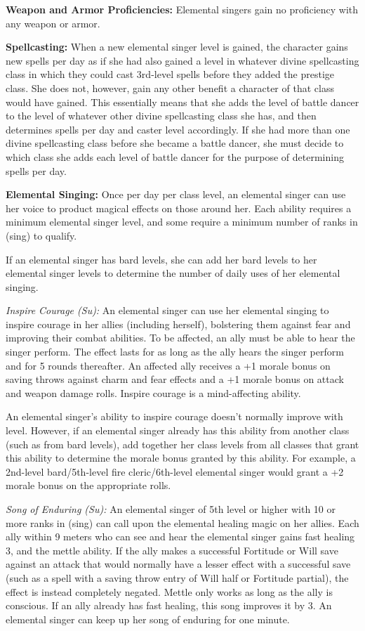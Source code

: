 {
\textbf{Weapon and Armor Proficiencies:} Elemental singers gain no proficiency with any weapon or armor.

\textbf{Spellcasting:} When a new elemental singer level is gained, the character gains new spells per day as if she had also gained a level in whatever divine spellcasting class in which they could cast 3rd-level spells before they added the prestige class. She does not, however, gain any other benefit a character of that class would have gained. This essentially means that she adds the level of battle dancer to the level of whatever other divine spellcasting class she has, and then determines spells per day and caster level accordingly. If she had more than one divine spellcasting class before she became a battle dancer, she must decide to which class she adds each level of battle dancer for the purpose of determining spells per day.

\textbf{Elemental Singing:} Once per day per class level, an elemental singer can use her voice to product magical effects on those around her. Each ability requires a minimum elemental singer level, and some require a minimum number of ranks in  (sing) to qualify.

If an elemental singer has bard levels, she can add her bard levels to her elemental singer levels to determine the number of daily uses of her elemental singing.

\textit{Inspire Courage (Su):} An elemental singer can use her elemental singing to inspire courage in her allies (including herself), bolstering them against fear and improving their combat abilities. To be affected, an ally must be able to hear the singer perform. The effect lasts for as long as the ally hears the singer perform and for 5 rounds thereafter. An affected ally receives a +1 morale bonus on saving throws against charm and fear effects and a +1 morale bonus on attack and weapon damage rolls. Inspire courage is a mind-affecting ability.

An elemental singer's ability to inspire courage doesn't normally improve with level. However, if an elemental singer already has this ability from another class (such as from bard levels), add together her class levels from all classes that grant this ability to determine the morale bonus granted by this ability. For example, a 2nd-level bard/5th-level fire cleric/6th-level elemental singer would grant a +2 morale bonus on the appropriate rolls.

\textit{Song of Enduring (Su):} An elemental singer of 5th level or higher with 10 or more ranks in  (sing) can call upon the elemental healing magic on her allies. Each ally within 9 meters who can see and hear the elemental singer gains fast healing 3, and the mettle ability. If the ally makes a successful Fortitude or Will save against an attack that would normally have a lesser effect with a successful save (such as a spell with a saving throw entry of Will half or Fortitude partial), the effect is instead completely negated. Mettle only works as long as the ally is conscious. If an ally already has fast healing, this song improves it by 3. An elemental singer can keep up her song of enduring for one minute.

}
